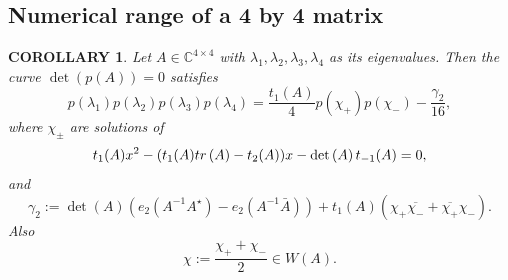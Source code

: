 \documentclass[10pt,a4paper,reqno]{amsart}
\newtheorem{dk}[defi]{\bf C\scriptsize OROLLARY \normalsize}
\newenvironment{corollary}{\begin{dk}\it}{\end{dk}}
\newcommand{\zav}[1]{\left( #1 \right)}
\newcommand{\deter}[1]{\det\zav{#1}}
\newcommand{\tr}{{\rm tr}\,}
\begin{document}
\subsection{Numerical range of a 4 by 4 matrix}
\begin{corollary}\label{4by4case}
Let $A\in\mathbb{C}^{4\times 4}$ with $\lambda_1,\lambda_2,\lambda_3, \lambda_4$ as its eigenvalues. Then the curve $\deter{p(A)}=0$ satisfies
\begin{equation}\label{covalpa4}
p(\lambda_1)p(\lambda_2)p(\lambda_3)p(\lambda_4)=\frac{t_1(A)}{4}p(\chi_+)p(\chi_-)-\frac{\gamma_2}{16},
\end{equation}
where $\chi_{\pm}$ are solutions of 
\begin{equation}\label{lambda2jformula}
t_1(A) x^2- (t_1(A)\tr(A)-t_2(A))x-\deter{A}t_{-1}(A)=0,
\end{equation}
and 
\begin{equation}
\gamma_2:=\deter{A}\zav{e_2\zav{A^{-1}A^\star}-e_2\zav{A^{-1}\bar A }}+t_1(A)\zav{\chi_+\overline{\chi_-}+\overline{\chi_+}\chi_-}.
\end{equation}
Also
\begin{equation}\label{centroid4by4}
\chi:=\frac{\chi_++\chi_-}{2}\in W(A).
\end{equation}
\end{corollary}
\end{document}
